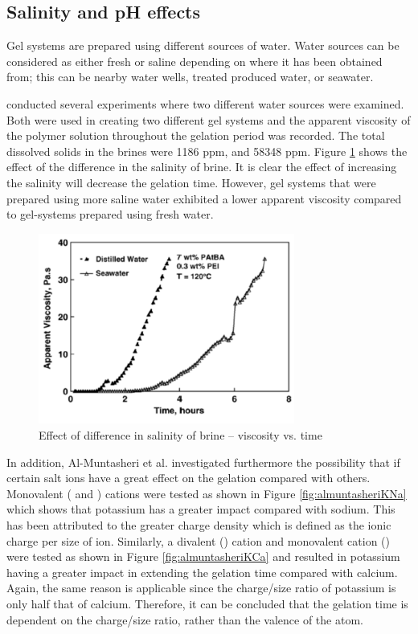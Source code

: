 \subsection{Salinity and pH effects}
Gel systems are prepared using different sources of water. Water sources can be considered as either fresh or saline  depending on where it has been obtained from; this can be nearby water wells, treated produced water, or seawater.

\citet{Al-Muntasheri2007} conducted several experiments where two different water sources were examined. Both were used in creating two different gel systems and the apparent viscosity of the polymer solution throughout the gelation period was recorded. The total dissolved solids in the brines were 1186 ppm, and 58348 ppm. Figure \ref{fig:almuntasheriSal} shows the effect of the difference in the salinity of brine. It is clear the effect of increasing the salinity will decrease the gelation time. However, gel systems that were prepared using more saline water exhibited a lower apparent viscosity compared to gel-systems prepared using fresh water.

\begin{figure}
    \centering
    \includegraphics[width=0.75\textwidth]{img/fig/almuntasheriSal.png}
    \caption{Effect of difference in salinity of brine – viscosity vs. time \citep{Al-Muntasheri2007}}
    \label{fig:almuntasheriSal} %
\end{figure}

In addition, Al-Muntasheri et al. investigated furthermore the possibility that if certain salt ions have a great effect on the gelation compared with others. Monovalent ( and ) cations were tested as shown in Figure \ref{fig:almuntasheriKNa} which shows that potassium has a greater impact compared with sodium. This has been attributed to the greater charge density which is defined as the ionic charge per size of ion. Similarly, a divalent () cation and monovalent cation () were tested as shown in Figure \ref{fig:almuntasheriKCa} and resulted in potassium having a greater impact in extending the gelation time compared with calcium. Again, the same reason is applicable since the charge/size ratio of potassium is only half that of calcium. Therefore, it can be concluded that the gelation time is dependent on the charge/size ratio, rather than the valence of the atom.

